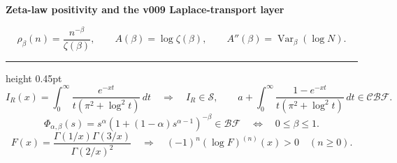 \documentclass[11pt]{article}
\begin{document}
\color{ink}
{\large\bfseries Zeta-law positivity and the v009 Laplace-transport layer}\par
\vspace{0.12in}
\[
  \rho_\beta(n)=\frac{n^{-\beta}}{\zeta(\beta)},\qquad
  A(\beta)=\log\zeta(\beta),\qquad
  A''(\beta)=\operatorname{Var}_\beta(\log N).
\]
\vspace{-0.05in}
\hrule height 0.45pt
\vspace{0.07in}
\[
  I_R(x)=\int_0^\infty \frac{e^{-xt}}{t(\pi^2+\log^2 t)}\,dt
  \quad\Longrightarrow\quad
  I_R\in \mathcal S,\qquad
  a+\int_0^\infty\frac{1-e^{-xt}}{t(\pi^2+\log^2t)}\,dt\in\mathcal{CBF}.
\]
\vspace{-0.06in}
\[
  \Phi_{\alpha,\beta}(s)=s^\alpha\!\left(1+(1-\alpha)s^{\alpha-1}\right)^{-\beta}
  \in \mathcal{BF}
  \quad\Longleftrightarrow\quad
  0\le \beta\le 1.
\]
\vspace{-0.06in}
\[
  F(x)=\frac{\Gamma(1/x)\Gamma(3/x)}{\Gamma(2/x)^2}
  \quad\Longrightarrow\quad
  (-1)^n(\log F)^{(n)}(x)>0\quad(n\ge0).
\]
\end{document}
